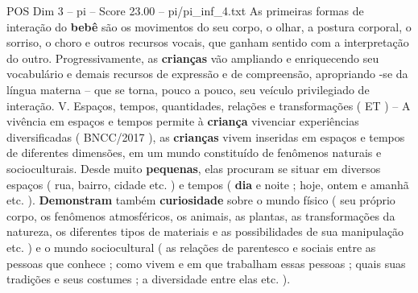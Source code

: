 \begin{textsample}{POS Dim 3 – pi – Score 23.00 – pi/pi\_inf\_4.txt}
As primeiras formas de interação do \textbf{bebê} são os movimentos do seu corpo, o olhar, a postura corporal, o sorriso, o choro e outros recursos vocais, que ganham sentido com a interpretação do outro.
Progressivamente, as \textbf{crianças} vão ampliando e enriquecendo seu vocabulário e demais recursos de expressão e de compreensão, apropriando -se da língua materna – que se torna, pouco a pouco, seu veículo privilegiado de interação.
V.
Espaços, tempos, quantidades, relações e transformações ( ET ) – A vivência em espaços e tempos permite à \textbf{criança} vivenciar experiências diversificadas ( BNCC/2017 ), as \textbf{crianças} vivem inseridas em espaços e tempos de diferentes dimensões, em um mundo constituído de fenômenos naturais e socioculturais.
Desde muito \textbf{pequenas}, elas procuram se situar em diversos espaços ( rua, bairro, cidade etc. ) e tempos ( \textbf{dia} e noite ; hoje, ontem e amanhã etc. ). \textbf{Demonstram} também \textbf{curiosidade} sobre o mundo físico ( seu próprio corpo, os fenômenos atmosféricos, os animais, as plantas, as transformações da natureza, os diferentes tipos de materiais e as possibilidades de sua manipulação etc. ) e o mundo sociocultural ( as relações de parentesco e sociais entre as pessoas que conhece ; como vivem e em que trabalham essas pessoas ; quais suas tradições e seus costumes ; a diversidade entre elas etc. ).

\end{textsample}
